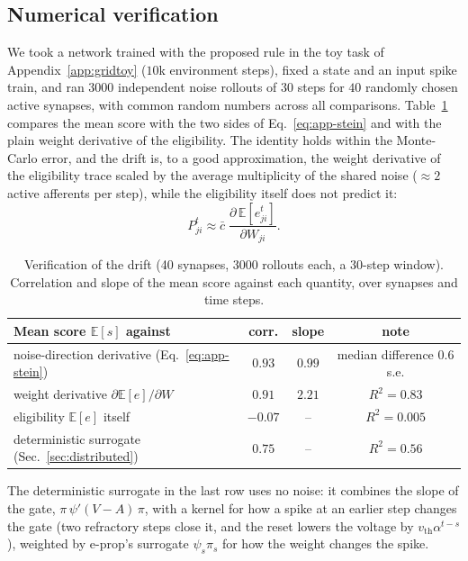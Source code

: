 \documentclass[10pt,twocolumn]{article}
\begin{document}
\subsection{Numerical verification}
\label{app:decomp-verify}
We took a network trained with the proposed rule in the toy task of
Appendix~\ref{app:gridtoy} ($10$k environment steps), fixed a state and an input
spike train, and ran $3000$ independent noise rollouts of
$30$ steps for $40$ randomly chosen active synapses, with common random numbers
across all comparisons. Table~\ref{tab:verify} compares the mean score with the
two sides of Eq.~\eqref{eq:app-stein} and with the plain weight derivative of
the eligibility. The identity holds within the Monte-Carlo error, and the drift
is, to a good approximation, the weight derivative of the eligibility trace
scaled by the average multiplicity of the shared noise ($\approx2$ active
afferents per step), while the eligibility itself does not predict it:
\begin{equation}
P^t_{ji}\approx\bar c\;\frac{\partial\,\mathbb{E}[e^t_{ji}]}{\partial W_{ji}} .
\label{eq:app-P-approx}
\end{equation}

\begin{table}[h]
\centering\small
\caption{Verification of the drift (40 synapses, 3000 rollouts each, a
30-step window). Correlation and slope of the mean score against each quantity,
over synapses and time steps.}
\label{tab:verify}
\begin{tabular}{lccc}
\toprule
Mean score $\mathbb{E}[s]$ against & corr. & slope & note\\
\midrule
noise-direction derivative (Eq.~\ref{eq:app-stein}) & $0.93$ & $0.99$ & median difference $0.6$ s.e.\\
weight derivative $\partial\mathbb{E}[e]/\partial W$ & $0.91$ & $2.21$ & $R^2=0.83$\\
eligibility $\mathbb{E}[e]$ itself & $-0.07$ & -- & $R^2=0.005$\\
deterministic surrogate (Sec.~\ref{sec:distributed}) & $0.75$ & -- & $R^2=0.56$\\
\bottomrule
\end{tabular}
\end{table}

The deterministic surrogate in the last row uses no noise: it combines the slope of
the gate, $\pi\,\psi'(V-A)\,\pi$, with a kernel for how a spike at an earlier step
changes the gate (two refractory steps close it, and the reset lowers the voltage
by $v_{\mathrm{th}}\alpha^{t-s}$), weighted by e-prop's surrogate $\psi_s\pi_s$ for how
the weight changes the spike.
\end{document}
